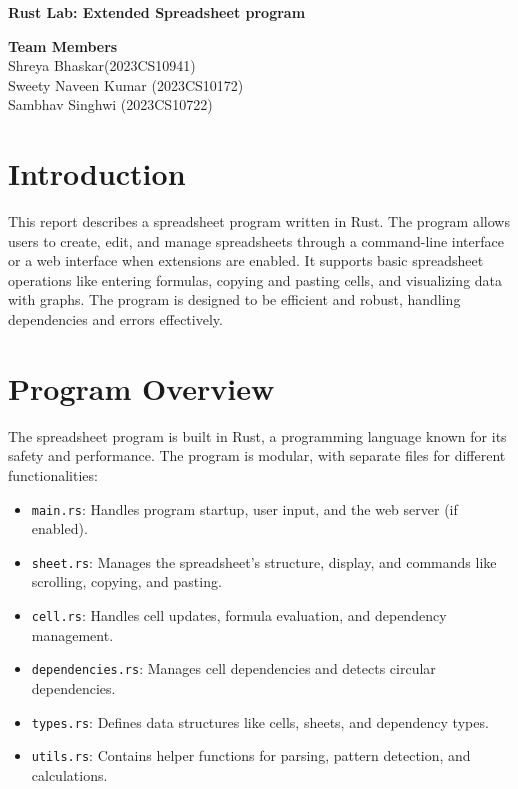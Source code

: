 \documentclass[12pt]{article}
\begin{document}
\begin{center}
\vspace*{0.5cm}
\Large
\textbf{Rust Lab: Extended Spreadsheet program}

\vspace{0.5cm}
\small
\textbf{Team Members}
\vspace{0.5cm}
\\Shreya Bhaskar(2023CS10941)
\\Sweety Naveen Kumar (2023CS10172)
\\Sambhav Singhwi (2023CS10722)
\vspace{0.5cm}
\end{center}

\tableofcontents
\newpage






\section{Introduction}
This report describes a spreadsheet program written in Rust. The program allows users to create, edit, and manage spreadsheets through a command-line interface or a web interface when extensions are enabled. It supports basic spreadsheet operations like entering formulas, copying and pasting cells, and visualizing data with graphs. The program is designed to be efficient and robust, handling dependencies and errors effectively.

\section{Program Overview}
The spreadsheet program is built in Rust, a programming language known for its safety and performance. The program is modular, with separate files for different functionalities:
\begin{itemize}
    \item \texttt{main.rs}: Handles program startup, user input, and the web server (if enabled).
    \item \texttt{sheet.rs}: Manages the spreadsheet’s structure, display, and commands like scrolling, copying, and pasting.
    \item \texttt{cell.rs}: Handles cell updates, formula evaluation, and dependency management.
    \item \texttt{dependencies.rs}: Manages cell dependencies and detects circular dependencies.
    \item \texttt{types.rs}: Defines data structures like cells, sheets, and dependency types.
    \item \texttt{utils.rs}: Contains helper functions for parsing, pattern detection, and calculations.
\end{itemize}
\end{document}
